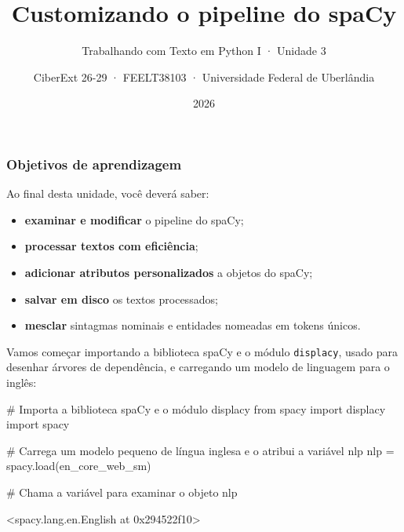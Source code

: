 \documentclass[
  brazilian,
  11pt,
]{article}
\title{Customizando o pipeline do spaCy}
\subtitle{Trabalhando com Texto em Python I · Unidade 3}
\author{CiberExt 26-29 · FEELT38103 · Universidade Federal de
Uberlândia}
\date{2026}
\newenvironment{Shaded}{\begin{snugshade}}{\end{snugshade}}
\newcommand{\CommentTok}[1]{\textcolor[rgb]{0.48,0.49,0.49}{#1}}
\newcommand{\ImportTok}[1]{\textcolor[rgb]{0.15,0.68,0.38}{#1}}
\newcommand{\NormalTok}[1]{\textcolor[rgb]{0.81,0.81,0.76}{#1}}
\newcommand{\OperatorTok}[1]{\textcolor[rgb]{0.81,0.81,0.76}{#1}}
\newcommand{\StringTok}[1]{\textcolor[rgb]{0.96,0.31,0.31}{#1}}
\providecommand{\tightlist}{%
  \setlength{\itemsep}{0pt}\setlength{\parskip}{0pt}}
\let\oldtexttt\texttt
\renewcommand{\texttt}[1]{{\color{inlink}\oldtexttt{#1}}}
\begin{document}
\maketitle

{
\setcounter{tocdepth}{2}
\tableofcontents
}
\subsubsection{Objetivos de
aprendizagem}\label{objetivos-de-aprendizagem}

Ao final desta unidade, você deverá saber:

\begin{itemize}
\tightlist
\item
  \textbf{examinar e modificar} o pipeline do spaCy;
\item
  \textbf{processar textos com eficiência};
\item
  \textbf{adicionar atributos personalizados} a objetos do spaCy;
\item
  \textbf{salvar em disco} os textos processados;
\item
  \textbf{mesclar} sintagmas nominais e entidades nomeadas em tokens
  únicos.
\end{itemize}

Vamos começar importando a biblioteca spaCy e o módulo
\texttt{displacy}, usado para desenhar árvores de dependência, e
carregando um modelo de linguagem para o inglês:

\begin{Shaded}
\begin{Highlighting}[]
\CommentTok{\# Importa a biblioteca spaCy e o módulo displacy}
\ImportTok{from}\NormalTok{ spacy }\ImportTok{import}\NormalTok{ displacy}
\ImportTok{import}\NormalTok{ spacy}

\CommentTok{\# Carrega um modelo pequeno de língua inglesa e o atribui a variável \textquotesingle{}nlp\textquotesingle{}}
\NormalTok{nlp }\OperatorTok{=}\NormalTok{ spacy.load(}\StringTok{\textquotesingle{}en\_core\_web\_sm\textquotesingle{}}\NormalTok{)}

\CommentTok{\# Chama a variável para examinar o objeto}
\NormalTok{nlp}
\end{Highlighting}
\end{Shaded}

\begin{Shaded}
\begin{Highlighting}[]
\NormalTok{\textless{}spacy.lang.en.English at 0x294522f10\textgreater{}}
\end{Highlighting}
\end{Shaded}
\end{document}
